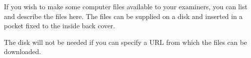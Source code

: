 \documentclass[12pt,openany,a4paper]{book}
\begin{document}
If you wish to make some computer files available to your examiners,
you can list and describe the files here.  The files can be supplied
on a disk and inserted in a pocket fixed to the inside back cover.

The disk will not be needed if you can specify a URL from which the
files can be downloaded.

\cleardoublepage











\end{document}
